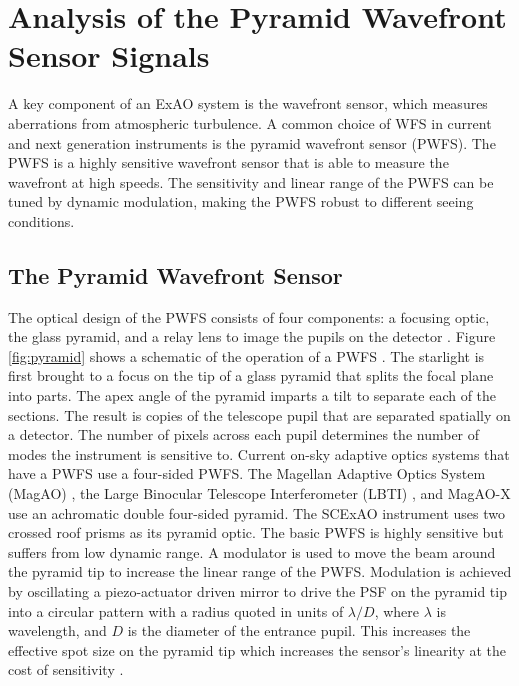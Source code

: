 \chapter{Analysis of the Pyramid Wavefront Sensor Signals}\label{CH3}

A key component of an ExAO system is the wavefront sensor, which measures aberrations from atmospheric turbulence. A common choice of WFS in current and next generation instruments is the pyramid wavefront sensor (PWFS). The PWFS is a highly sensitive wavefront sensor that is able to measure the wavefront at high speeds. The sensitivity and linear range of the PWFS can be tuned by dynamic modulation, making the PWFS robust to different seeing conditions. 


\section{The Pyramid Wavefront Sensor}\label{PWFSintro}
The optical design of the PWFS consists of four components: a focusing optic, the glass pyramid, and a relay lens to image the pupils on the detector \citep{ragazzoni2002pyramid}. Figure \ref{fig:pyramid} shows a schematic of the operation of a PWFS \citep{shatokhina2014fast}.  The starlight is first brought to a focus on the tip of a glass pyramid that splits the focal plane into parts. The apex angle of the pyramid imparts a tilt to separate each of the sections. The result is copies of the telescope pupil that are separated spatially on a detector. The number of pixels across each pupil determines the number of modes the instrument is sensitive to. Current on-sky adaptive optics systems that have a PWFS use a four-sided PWFS. The Magellan Adaptive Optics System (MagAO) \citep{close2018status}, the Large Binocular Telescope Interferometer (LBTI) \citep{esposito2011adaptive}, and MagAO-X use an achromatic double four-sided pyramid. The SCExAO instrument uses two crossed roof prisms as its pyramid optic. The basic PWFS is highly sensitive but suffers from low dynamic range. A modulator is used to move the beam around the pyramid tip to increase the linear range of the PWFS. Modulation is achieved by oscillating a piezo-actuator driven mirror to drive the PSF on the pyramid tip into a circular pattern with a radius quoted in units of $\lambda/D$, where $\lambda$ is wavelength, and $D$ is the diameter of the entrance pupil. This increases the effective spot size on the pyramid tip which increases the sensor's linearity at the cost of sensitivity \citep{guyon2005}.  

